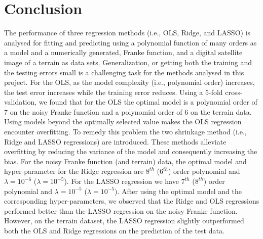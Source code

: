 \documentclass[a4paper]{article}
\begin{document}
\section{Conclusion}
The performance of three regression methods (i.e., OLS, Ridge, and LASSO) is analysed for fitting and predicting using a polynomial function of many orders as a model and a numerically generated, Franke function, and a digital satellite image of a terrain as data sets. Generalization, or getting both the training and the testing errors small is a challenging task for the methods analysed in this project. For the OLS, as the model complexity (i.e., polynomial order) increases, the test error increases while the training error reduces. Using a $5$-fold cross-validation, we found that for the OLS the optimal model is a polynomial order of $7$ on the noisy Franke function and a polynomial order of $6$ on the terrain data. Using models beyond the optimally selected value makes the OLS regression encounter overfitting. To remedy this problem the two shrinkage method (i.e., Ridge and LASSO regressions) are introduced. These methods alleviate overfitting by reducing the variance of the model and consequently increasing the bias. For the noisy Franke function (and terrain) data, the optimal model and hyper-parameter for the Ridge regression are $8^{th}$ ($6^{th}$) order polynomial and $\lambda=10^{-6}$ ($\lambda=10^{-5}$). For the LASSO regression we have $7^{th}$ ($8^{th}$) order polynomial and $\lambda=10^{-5}$ ($\lambda=10^{-5}$). After using the optimal model and the corresponding hyper-parameters, we observed that the Ridge and OLS regressions performed better than the LASSO regression on the noisy Franke function. However, on the terrain dataset, the LASSO regression slightly outperformed both the OLS and Ridge regressions on the prediction of the test data.

%
%


\end{document}
